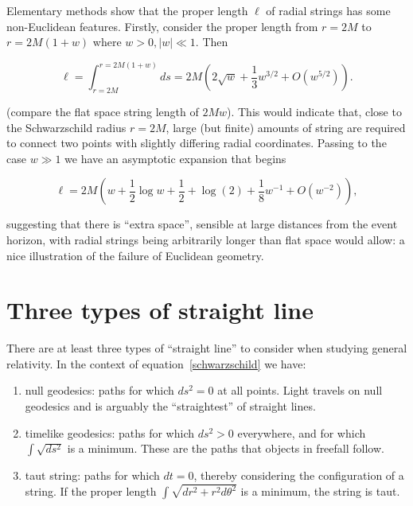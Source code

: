 \documentclass[review]{elsarticle}
\begin{document}
Elementary methods show that the proper length $\ell$ of radial
strings has some non-Euclidean features.  Firstly, consider the proper
length from $r=2M$ to $r=2M(1+w)$ where $w>0, \left|w\right|\ll 1$.
Then

 \begin{equation}\label{ell}
   \ell =
   \int_{r=2M}^{r=2M(1+w)}ds
   =2M\left(2\sqrt{w} + \frac{1}{3}w^{3/2} + O(w^{5/2})\right).
 \end{equation}

(compare the flat space string length of $2Mw$).  This would indicate
 that, close to the Schwarzschild radius $r=2M$, large (but finite)
 amounts of string are required to connect two points with slightly
 differing radial coordinates.  Passing to the case $w\gg 1$ we have
 an asymptotic expansion that begins


\begin{equation}\label{asymptotic_ell}
  \ell = 2M\left(w +  \frac{1}{2}\log w + \frac{1}{2} + \log(2)  +  \frac{1}{8}w^{-1} + O(w^{-2})\right),
\end{equation}

\noindent suggesting that there is ``extra space'', sensible at large
distances from the event horizon, with radial strings being
arbitrarily longer than flat space would allow: a nice illustration of
the failure of Euclidean geometry.

\section{Three types of straight line}

There are at least three types of ``straight line'' to consider when
studying general relativity.  In the context of
equation~\ref{schwarzschild} we have:

\begin{enumerate}
\item null geodesics: paths for which $ds^2=0$ at all points.  Light
  travels on null geodesics and is arguably the ``straightest'' of
  straight lines.
\item timelike geodesics: paths for which $ds^2>0$ everywhere, and for
  which $\int\sqrt{ds^2}$ is a minimum.  These are the paths that
  objects in freefall follow.
\item taut string: paths for which $dt=0$, thereby considering the
  configuration of a string.  If the proper length
  $\int\sqrt{dr^2+r^2d\theta^2}$ is a minimum, the string is taut.
\end{enumerate}
\end{document}
